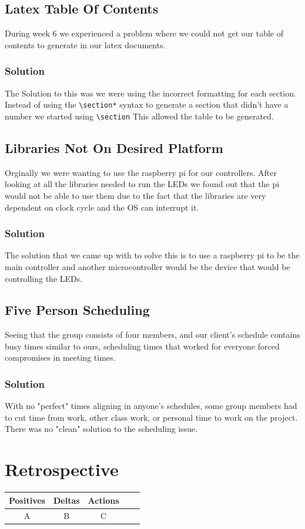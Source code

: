 \documentclass[onecolumn, draftclsnofoot,10pt, compsoc]{IEEEtran}
\begin{document}
			\subsection{Latex Table Of Contents}
			During week 6 we experienced a problem where we could not get our table
			of contents to generate in our latex documents.
				\subsubsection{Solution}
				The Solution to this was we were using the incorrect formatting for each
				section. Instead of using the \verb|\section*| syntax to generate a section that
				didn't have a number we started using \verb|\section| This allowed the table
				to be generated.
			\subsection{Libraries Not On Desired Platform}
      Orginally we were wanting to use the raspberry pi for our controllers. After
      looking at all the libraries needed to run the LEDs we found out that the
      pi would not be able to use them due to the fact that the libraries are very
      dependent on clock cycle and the OS can interrupt it.
		  	\subsubsection{Solution}
		    The solution that we came up with to solve this is to use a raspberry pi to
		    be the main controller and another microcontroller would be the device that
		    would be controlling the LEDs.
		 \subsection{Five Person Scheduling}
		 Seeing that the group consists of four members, and our client's schedule contains busy times similar to ours, scheduling times that worked for everyone
		 forced compromises in meeting times.
		 	  \subsubsection{Solution}
			  With no "perfect" times aligning in anyone's schedules, some group members had to cut time from work, other class work, or personal time to work on the project.
			  There was no "clean" solution to the scheduling issue.


	\section{Retrospective}
	\begin{tabular}{ |c|c|c|c|c| }
		\hline
		Positives & Deltas & Actions \\
		\hline
		A & B & C \\
		\hline
	\end{tabular}
\end{document}
